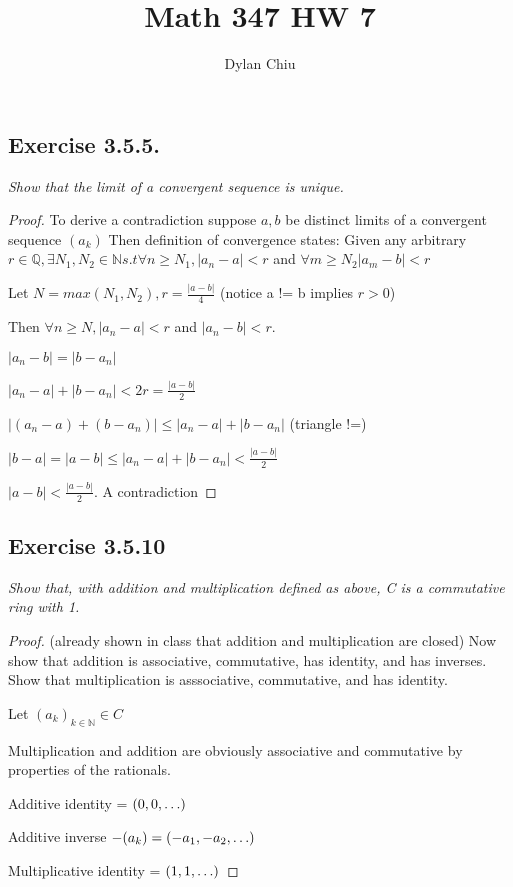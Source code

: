 \documentclass[12pt, a4paper]{article}
\title{Math 347 HW 7}
\author{Dylan Chiu}
\begin{document}
    \maketitle
    \subsection*{Exercise 3.5.5.}
        \textit{Show that the limit of a convergent sequence is unique.}
        \begin{proof}
            To derive a contradiction suppose $a,b$ be distinct limits of a convergent sequence $(a_k)$
            Then definition of convergence states: 
            Given any arbitrary $r \in \mathbb{Q}, \exists N_1, N_2 \in \mathbb{N} s.t \forall n \ge N_1, |a_n - a| < r$ and $\forall m \ge N_2 |a_m - b| < r$

            Let $N=max(N_1, N_2), r = \frac{|a-b|}{4}$ (notice a != b implies $r > 0$)

            Then $\forall n \ge N, |a_n - a| < r$ and $|a_n - b| < r.$

            $|a_n-b| = |b - a_n|$

            $|a_n - a| + |b - a_n| < 2r = \frac{|a-b|}{2}$
            
            $|(a_n-a)+(b-a_n)| \le |a_n - a| + |b - a_n|$ (triangle !=)

            $|b-a| = |a-b| \le |a_n - a| + |b - a_n| < \frac{|a-b|}{2}$

            $|a-b| < \frac{|a-b|}{2}$. A contradiction 
            
        \end{proof}
    \subsection*{Exercise 3.5.10}
        \textit{Show that, with addition and multiplication defined as above, C is a commutative ring with 1.}
        \begin{proof}
            (already shown in class that addition and multiplication are closed)
            Now show that addition is associative, commutative, has identity, and has inverses.
            Show that multiplication is asssociative, commutative, and has identity. 

            Let $(a_k)_{k\in \mathbb{N}} \in C$

            Multiplication and addition are obviously associative and commutative by properties of the rationals. 

            Additive identity = $(0,0,\mathellipsis)$

            Additive inverse $-(a_k) = (-a_1, -a_2, \mathellipsis)$

            Multiplicative identity = $(1,1,\mathellipsis)$
        \end{proof}
        \pagebreak
\end{document}
